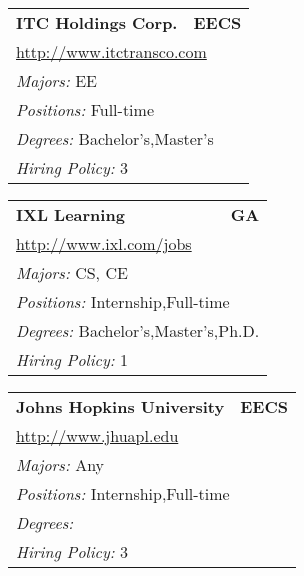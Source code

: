 \documentclass[twoside]{article}
\begin{document}
\begin{center}
\begin{multicols}{3}
\begin{FlushLeft}
\begin{minipage}{.9\columnwidth}
\end{minipage}
 
\begin{minipage}{.9\columnwidth}\begin{tabularx}{.95\columnwidth}{Xr}
                 {\Large\bf ITC Holdings Corp.} & {\Large\bf EECS}\\
    \multicolumn{2}{p{.95\columnwidth}}{\url{http://www.itctransco.com}}\\
    \multicolumn{2}{p{.95\columnwidth}}{\emph{Majors:} EE}\\
    \multicolumn{2}{p{.95\columnwidth}}{\emph{Positions:} Full-time}\\
    \multicolumn{2}{p{.95\columnwidth}}{\emph{Degrees:} Bachelor's,Master's}\\
    \multicolumn{2}{p{.95\columnwidth}}{\emph{Hiring Policy:} 3}\\
    \end{tabularx}
    
\end{minipage}
 
\begin{minipage}{.9\columnwidth}\begin{tabularx}{.95\columnwidth}{Xr}
                 {\Large\bf IXL Learning} & {\Large\bf GA}\\
    \multicolumn{2}{p{.95\columnwidth}}{\url{http://www.ixl.com/jobs}}\\
    \multicolumn{2}{p{.95\columnwidth}}{\emph{Majors:} CS, CE}\\
    \multicolumn{2}{p{.95\columnwidth}}{\emph{Positions:} Internship,Full-time}\\
    \multicolumn{2}{p{.95\columnwidth}}{\emph{Degrees:} Bachelor's,Master's,Ph.D.}\\
    \multicolumn{2}{p{.95\columnwidth}}{\emph{Hiring Policy:} 1}\\
    \end{tabularx}
    
\end{minipage}
 
\begin{minipage}{.9\columnwidth}\begin{tabularx}{.95\columnwidth}{Xr}
                 {\Large\bf Johns Hopkins University} & {\Large\bf EECS}\\
    \multicolumn{2}{p{.95\columnwidth}}{\url{http://www.jhuapl.edu}}\\
    \multicolumn{2}{p{.95\columnwidth}}{\emph{Majors:} Any}\\
    \multicolumn{2}{p{.95\columnwidth}}{\emph{Positions:} Internship,Full-time}\\
    \multicolumn{2}{p{.95\columnwidth}}{\emph{Degrees:} }\\
    \multicolumn{2}{p{.95\columnwidth}}{\emph{Hiring Policy:} 3}\\
    \end{tabularx}
    

\end{minipage}
\end{FlushLeft}
\end{multicols}
\end{center}
\end{document}
